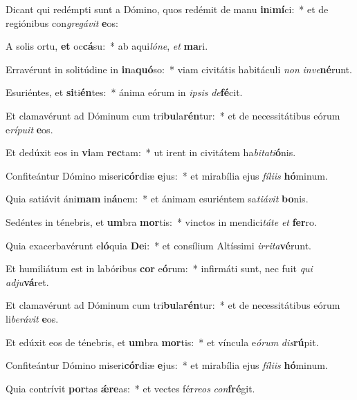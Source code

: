 \item Dicant qui redémpti sunt a Dómino, quos redémit de manu \textbf{in}i\textbf{mí}ci:~* et de regiónibus con\textit{gre}\textit{gá}\textit{vit} \textbf{e}os:
\item A solis ortu, \textbf{et} oc\textbf{cá}su:~* ab aqui\textit{ló}\textit{ne}, \textit{et} \textbf{ma}ri.
\item Erravérunt in solitúdine in \textbf{in}a\textbf{quó}so:~* viam civitátis habitáculi \textit{non} \textit{in}\textit{ve}\textbf{né}runt.
\item Esuriéntes, et \textbf{si}ti\textbf{én}tes:~* ánima eórum in \textit{ip}\textit{sis} \textit{de}\textbf{fé}cit.
\item Et clamavérunt ad Dóminum cum tri\textbf{bu}la\textbf{rén}tur:~* et de necessitátibus eórum e\textit{rí}\textit{pu}\textit{it} \textbf{e}os.
\item Et dedúxit eos in \textbf{vi}am \textbf{rec}tam:~* ut irent in civitátem ha\textit{bi}\textit{ta}\textit{ti}\textbf{ó}nis.
\item Confiteántur Dómino miseri\textbf{cór}diæ \textbf{e}jus:~* et mirabília ejus \textit{fí}\textit{li}\textit{is} \textbf{hó}minum.
\item Quia satiávit áni\textbf{mam} in\textbf{á}nem:~* et ánimam esuriéntem sa\textit{ti}\textit{á}\textit{vit} \textbf{bo}nis.
\item Sedéntes in ténebris, et \textbf{um}bra \textbf{mor}tis:~* vinctos in mendici\textit{tá}\textit{te} \textit{et} \textbf{fer}ro.
\item Quia exacerbavérunt e\textbf{ló}quia \textbf{De}i:~* et consílium Altíssimi \textit{ir}\textit{ri}\textit{ta}\textbf{vé}runt.
\item Et humiliátum est in labóribus \textbf{cor} e\textbf{ó}rum:~* infirmáti sunt, nec fuit \textit{qui} \textit{ad}\textit{ju}\textbf{vá}ret.
\item Et clamavérunt ad Dóminum cum tri\textbf{bu}la\textbf{rén}tur:~* et de necessitátibus eórum li\textit{be}\textit{rá}\textit{vit} \textbf{e}os.
\item Et edúxit eos de ténebris, et \textbf{um}bra \textbf{mor}tis:~* et víncula e\textit{ó}\textit{rum} \textit{dis}\textbf{rú}pit.
\item Confiteántur Dómino miseri\textbf{cór}diæ \textbf{e}jus:~* et mirabília ejus \textit{fí}\textit{li}\textit{is} \textbf{hó}minum.
\item Quia contrívit \textbf{por}tas \textbf{ǽ}\textbf{re}as:~* et vectes fér\textit{re}\textit{os} \textit{con}\textbf{fré}git.
